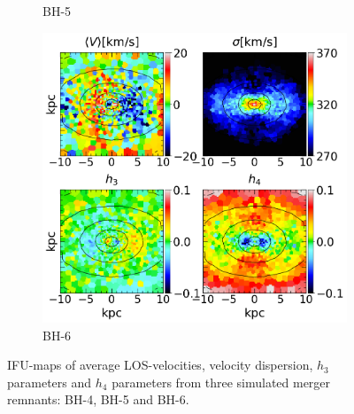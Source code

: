 \documentclass[english, oneside]{HYgradu}
\begin{document}
\begin{figure}
\begin{subfigure}[b]{0.49\textwidth}
		\caption{BH-5}
	\end{subfigure}
	\begin{subfigure}[b]{0.49\textwidth}
		\includegraphics[width=\textwidth]{BH_6.png}
		\caption{BH-6}
	\end{subfigure}
	\caption{IFU-maps of average LOS-velocities, velocity dispersion, $h_3$ parameters and $h_4$ parameters from three simulated merger remnants: BH-4, BH-5 and BH-6.}
\end{figure}



\newcommand{\apj}{The Astrophysical Journal}
\newcommand{\mnras}{Monthly Notices of the Royal Astronomical Society}
\newcommand{\apjs}{The Astrophysical Journal Supplement}
\newcommand{\nat}{Nature}
\newcommand{\aj}{The Astronomical Journal}
\newcommand{\na}{New Astronomy}

\clearpage
{} %


\end{document}

